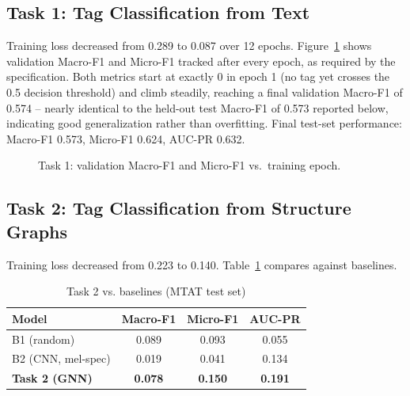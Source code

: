 \documentclass[conference]{IEEEtran}
\begin{document}
\subsection{Task 1: Tag Classification from Text}
Training loss decreased from 0.289 to 0.087 over 12 epochs.
Figure~\ref{fig:f1curve} shows validation Macro-F1 and Micro-F1 tracked
after every epoch, as required by the specification. Both metrics
start at exactly 0 in epoch 1 (no tag yet crosses the 0.5 decision
threshold) and climb steadily, reaching a final validation Macro-F1 of
0.574 -- nearly identical to the held-out test Macro-F1 of 0.573
reported below, indicating good generalization rather than
overfitting. Final test-set performance: Macro-F1 0.573, Micro-F1
0.624, AUC-PR 0.632.

\begin{figure}[t]
\centering
{}
\caption{Task 1: validation Macro-F1 and Micro-F1 vs.\ training epoch.}
\label{fig:f1curve}
\end{figure}

\subsection{Task 2: Tag Classification from Structure Graphs}
Training loss decreased from 0.223 to 0.140. Table~\ref{tab:task2}
compares against baselines.

\begin{table}[h]
\centering
\caption{Task 2 vs. baselines (MTAT test set)}
\label{tab:task2}
\begin{tabular}{lccc}
\toprule
Model & Macro-F1 & Micro-F1 & AUC-PR \\
\midrule
B1 (random) & 0.089 & 0.093 & 0.055 \\
B2 (CNN, mel-spec) & 0.019 & 0.041 & 0.134 \\
\textbf{Task 2 (GNN)} & \textbf{0.078} & \textbf{0.150} & \textbf{0.191} \\
\bottomrule
\end{tabular}
\end{table}
\end{document}
